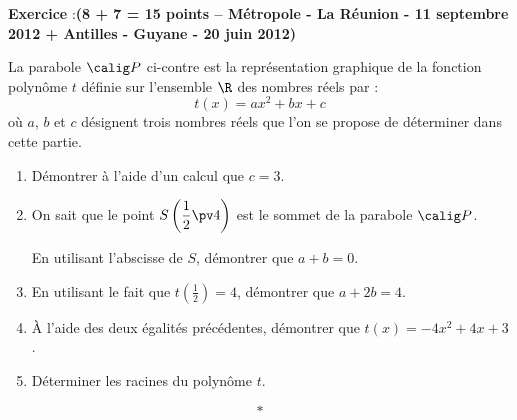 \documentclass[12pt,french]{article}
\newcounter{exoc}
\newenvironment{exoc}[1]{%
  \refstepcounter{exoc}\textbf{Exercice \theexoc} :\hfill {\footnotesize\textbf{(#1)}}\par
  \medskip}%
{\medskip}
\begin{document}
\begin{exoc}{8 + 7 = 15 points -- Métropole - La Réunion - 11 septembre 2012 + Antilles - Guyane - 20 juin 2012}
\begin{minipage}{0.5\linewidth}
    La parabole $\calig P$ ci-contre est la représentation graphique de la fonction polynôme $t$ définie sur l'ensemble $\R$ des nombres réels par :
    \[t(x) = ax^2 + bx + c\] où $a$, $b$ et $c$ désignent trois nombres réels que l'on se propose de déterminer dans cette partie.\par\medskip
\end{minipage}\hfill
\begin{minipage}{0.5\linewidth}
\begin{center}
\end{center}
\end{minipage}

\begin{enumerate}
    \item Démontrer à l'aide d'un calcul que $c = 3$.
    \item On sait que le point $S\left(\dfrac 12\pv 4\right)$ est le sommet de la parabole $\calig P$.\par
    En utilisant l'abscisse de $S$, démontrer que $a + b = 0$.
    \item En utilisant le fait que $t\left(\frac 1 2\right) = 4$, démontrer que $a + 2b = 4$.
    \item À l'aide des deux égalités précédentes, démontrer que $t(x) = -4x^2 + 4x + 3$.
    \item Déterminer les racines du polynôme $t$.
\end{enumerate}
\end{exoc}\[*\]\clearpage
\end{document}
